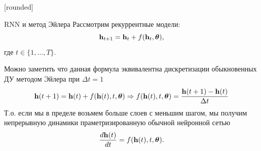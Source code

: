 
[rounded]
\usepackage{graphicx,animate}


\usepackage{tikz}
\usepackage{amsmath}
\usepackage[english,russian]{babel}
\usepackage[labelformat=empty]{caption}

\usepackage{graphicx,animate}
\usepackage{animate}
\usepackage{svg}
\usepackage{subcaption}

\usetikzlibrary{arrows,shapes,positioning,shadows,trees}
\newcommand*{\defeq}{\stackrel{\text{def}}{=}}


\begin{frame}[plain]
\titlepage
\end{frame}

\begin{frame}{RNN и метод Эйлера}
    Рассмотрим рекуррентные модели:
    \begin{displaymath}
        \mathbf{h}_{t+1} = \mathbf{h}_t + f(\mathbf{h}_t, \boldsymbol{\theta}),
    \end{displaymath}
    где $t\in \{1, \dots, T\}$. \par
    Можно заметить что данная формула эквивалентна дискретизации обыкновенных ДУ методом Эйлера при $\Delta t = 1$
    \begin{displaymath}
        \mathbf{h}(t+1) = \mathbf{h}(t) + f(\mathbf{h}(t), t, \boldsymbol{\theta}) \Rightarrow f(\mathbf{h}(t), t, \boldsymbol{\theta}) = \frac{\mathbf{h}(t+1) - \mathbf{h}(t)}{\Delta t}
    \end{displaymath}
    Т.о. если мы в пределе возьмем больше слоев с меньшим шагом, мы получим непрерывную динамики праметризированную обычной нейронной сетью
    \begin{displaymath}
        \frac{d\mathbf{h}(t)}{dt} = f(\mathbf{h}(t), t, \boldsymbol{\theta}).
    \end{displaymath}
\end{frame}

